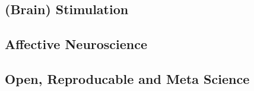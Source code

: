 \subsection*{(Brain) Stimulation}

% 
% 
% 
% 
% 

\subsection*{Affective Neuroscience}

% 
% 
% 
% 
% 
% 
% 
% 
% 
% 
% 
% 

\subsection*{Open, Reproducable and Meta Science}

% 
% 
% 
% 
% 
\newpage